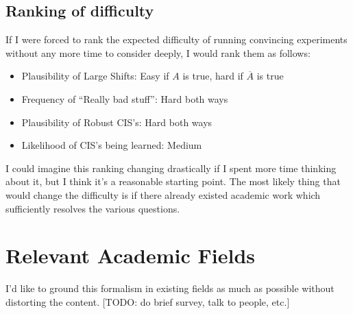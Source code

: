 \documentclass{article}
\begin{document}
\subsection{Ranking of difficulty}
If I were forced to rank the expected difficulty of running convincing experiments without any more time to consider deeply, I would rank them as follows:
\begin{itemize}
    \item Plausibility of Large Shifts: Easy if $A$ is true, hard if $\overline{A}$ is true
    \item Frequency of ``Really bad stuff”: Hard both ways
    \item Plausibility of Robust CIS's: Hard both ways
    \item Likelihood of CIS's being learned: Medium
\end{itemize}
I could imagine this ranking changing drastically if I spent more time thinking about it, but I think it’s a reasonable starting point. The most likely thing that would change the difficulty is if there already existed academic work which sufficiently resolves the various questions. 

\section{Relevant Academic Fields}
I'd like to ground this formalism in existing fields as much as possible without distorting the content. [TODO: do brief survey, talk to people, etc.]

\end{document}
